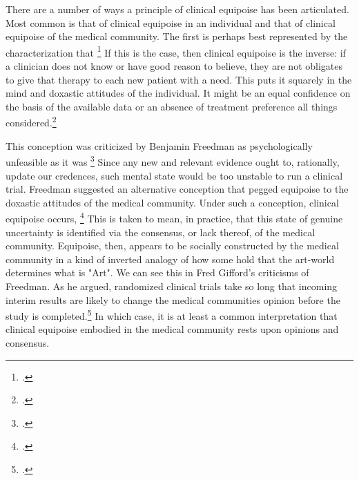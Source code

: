 \documentclass[letterpaper,notitlepage,12pt]{article}
\begin{document}
There are a number of ways a principle of clinical
equipoise has been articulated.
Most common is that of clinical equipoise in an individual and that of clinical
equipoise of the medical community.
The first is perhaps best represented by the characterization that \footcite{Shaw and Chalmers 1970}
If this is the case, then clinical equipoise is the inverse: if a clinician does
not know or have good reason to believe, they are not obligates to give that
therapy to each new patient with a need.
This puts it squarely in the mind and doxastic attitudes of the individual.
It might be an equal confidence on the basis
of the available data or an absence of treatment preference all things
considered.\footcite{Fried 1974}

This conception was criticized by Benjamin Freedman as psychologically
unfeasible as it was \footcite{Freedman,
1987, 143}
Since any new and relevant evidence ought to, rationally, update our credences,
such mental state would be too unstable to run a clinical trial.
Freedman suggested an alternative conception that pegged equipoise to the
doxastic attitudes of the medical community.
Under such a conception, clinical equipoise occurs, \footcite{freedman 1987}
This is taken to mean, in practice, that this state of genuine uncertainty is
identified via the consensus, or lack thereof, of the medical community.
Equipoise, then, appears to be socially constructed by the medical community in
a kind of inverted analogy of how some hold that the art-world determines what
is "Art".
We can see this in Fred Gifford's criticisms of Freedman.
As he argued, randomized clinical trials take so long that incoming interim
results are likely to change the medical communities opinion before the study is
completed.\footcite{Gifford 1995 129}
In which case, it is at least a common interpretation that clinical equipoise
embodied in the medical community rests upon opinions and consensus.
\end{document}
